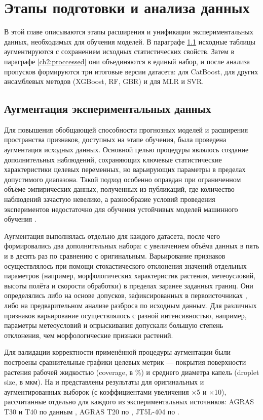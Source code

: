 \chapter{Этапы подготовки и анализа данных} \label{ch2}

В этой главе описываются этапы расширения и унификации экспериментальных данных, необходимых для обучения моделей. В параграфе \ref{ch2:augment} исходные таблицы аугментируются с сохранением исходных статистических свойств. Затем в параграфе \ref{ch2:proccessed} они объединяются в единый набор, и после анализа пропусков формируются три итоговые версии датасета: для CatBoost, для других ансамблевых методов (XGBoost, RF, GBR) и для MLR и SVR.

\section{Аугментация экспериментальных данных} \label{ch2:augment}

Для повышения обобщающей способности прогнозных моделей и расширения пространства признаков, доступных на этапе обучения, была проведена аугментация исходных данных. Основной целью процедуры являлось создание дополнительных наблюдений, сохраняющих ключевые статистические характеристики целевых переменных, но варьирующих параметры в пределах допустимого диапазона. Такой подход особенно оправдан при ограниченном объёме эмпирических данных, полученных из публикаций, где количество наблюдений зачастую невелико, а разнообразие условий проведения экспериментов недостаточно для обучения устойчивых моделей машинного обучения \cite{Shorten2019, Feng2021}.

Аугментация выполнялась отдельно для каждого датасета, после чего формировались два дополнительных набора: с увеличением объёма данных в пять и в десять раз по сравнению с оригинальным. Варьирование признаков осуществлялось при помощи стохастического отклонения значений отдельных параметров (например, морфологических характеристик растения, метеоусловий, высоты полёта и скорости обработки) в пределах заранее заданных границ. Они определялись либо на основе допусков, зафиксированных в первоисточниках \cite{Liu2025, Wu2025, Vitoria2022}, либо на предварительном анализе разброса по исходным данным. Для различных признаков варьирование осуществлялось с разной интенсивностью, например, параметры метеоусловий и опрыскивания допускали большую степень отклонения, чем морфологические признаки растений.

Для валидации корректности применённой процедуры аугментации были построены сравнительные графики целевых метрик --- покрытия поверхности растения рабочей жидкостью (coverage, в \%) и среднего диаметра капель (droplet size, в мкм). На  и  представлены результаты для оригинальных и аугментированных выборок (с коэффициентами увеличения ×5 и ×10), рассчитанные отдельно для каждого из экспериментальных источников: AGRAS T30 и T40 по данным \cite{Wu2025}, AGRAS T20 по \cite{Liu2025}, JT5L-404 по \cite{Vitoria2022}.

